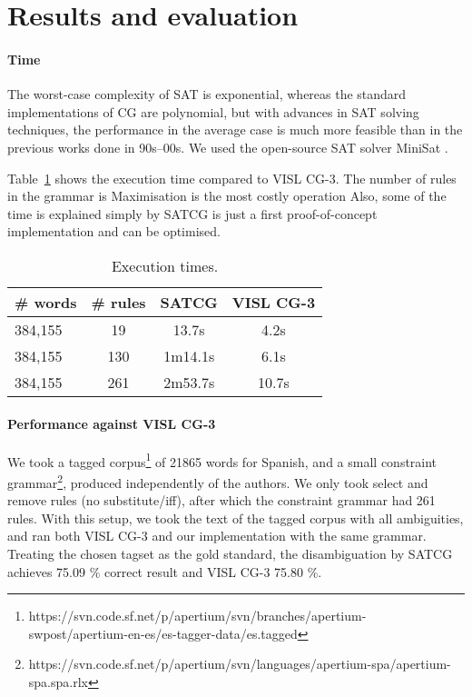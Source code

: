 \documentclass[11pt]{article}
\begin{document}
\section{Results and evaluation}

\paragraph{Time}

The worst-case complexity of SAT is exponential, whereas the standard implementations 
of CG are polynomial, but with advances in SAT solving techniques, the performance 
in the average case is much more feasible than in the previous works done in 90s--00s.
We used the open-source SAT solver MiniSat \cite{een04sat}.

Table~\ref{table:time} shows the execution time compared to VISL CG-3. 
The number of rules in the grammar is 
Maximisation is the most costly operation
Also, some of the time is explained simply by
SATCG is just a first proof-of-concept implementation and can be optimised.

\begin{table}
  \centering
  \begin{tabular}{|l|c|c|c|}
     \hline
   \textbf{\# words} & \textbf{\# rules} &  \textbf{SATCG} & \textbf{VISL CG-3} \\ \hline
                384,155  & 19    &  13.7s  & 4.2s\\ %
                384,155  & 130  &  1m14.1s & 6.1s \\ %
                384,155  & 261  &  2m53.7s & 10.7s \\ \hline
  \end{tabular}
  \caption{Execution times.}
  \label{table:time}
\end{table}

\paragraph{Performance against VISL CG-3}


We took a tagged corpus\footnote{https://svn.code.sf.net/p/apertium/svn/branches/apertium-swpost/apertium-en-es/es-tagger-data/es.tagged} of 21865 words for Spanish, 
and a small constraint grammar\footnote{https://svn.code.sf.net/p/apertium/svn/languages/apertium-spa/apertium-spa.spa.rlx}, produced independently of the authors.
We only took select and remove rules (no substitute/iff), after which the constraint grammar had 261 rules.
With this setup, we took the text of the tagged corpus with all ambiguities, and ran both VISL CG-3 and our implementation with the same grammar. 
Treating the chosen tagset as the gold standard, the disambiguation by SATCG achieves 75.09 \% correct result and VISL CG-3 75.80 \%.
\end{document}
